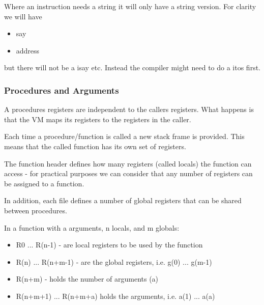 Where an instruction needs a string it will only have a string \textquotedbl{}version\textquotedbl{}. For clarity we will have

\begin{itemize}
\item say

\item address

\end{itemize}

but there will not be a isay etc. Instead the compiler might need to do a \textquotedbl{}itos\textquotedbl{} first.

\subsubsection{Procedures and Arguments}

A procedures registers are independent to the caller\textquotesingle{}s registers. What happens is that the VM maps its registers to the registers in the caller.

Each time a procedure/function is called a new \textquotedbl{}stack frame\textquotedbl{} is provided. This
means that the called function has its own set of registers.

The function header defines how many registers (called
locals) the function can access - for practical purposes we can consider that
any number of registers can be assigned to a function.

In addition, each file defines a number of global registers that can be shared between procedures.

In a function with \textquotesingle{}a\textquotesingle{} arguments, \textquotesingle{}n\textquotesingle{} locals, and \textquotesingle{}m\textquotesingle{} globals:

\begin{itemize}
\item R0 ... R(n-1) - are local registers to be used by the function

\item R(n) ... R(n+m-1) - are the global registers, i.e. g(0) ... g(m-1)

\item R(n+m) - holds the number of arguments (a)

\item R(n+m+1) ... R(n+m+a) holds the arguments, i.e. a(1) ... a(a)

\end{itemize}

